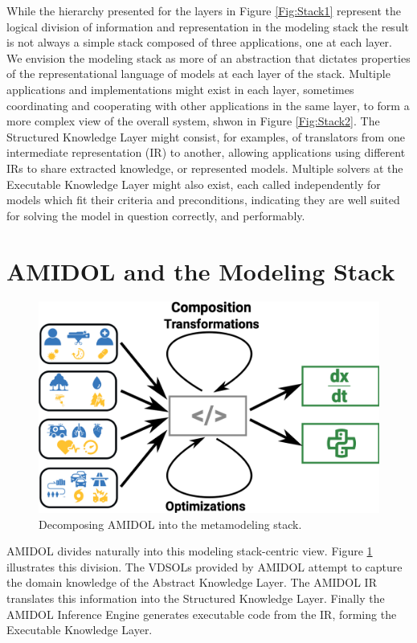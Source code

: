 \documentclass[11pt]{article}
\newcommand{\amidol}{\textsc{AMIDOL}}
\begin{document}
While the hierarchy presented for the layers in Figure
\ref{Fig:Stack1} represent the logical division of information and
representation in the modeling stack the result is not always a
simple stack composed of three applications, one at each layer.  We
envision the modeling stack as more of an abstraction that dictates
properties of the representational language of models at each layer of
the stack.  Multiple applications and implementations might exist in
each layer, sometimes coordinating and cooperating with other
applications in the same layer, to form a more complex view of the
overall system, shwon in Figure \ref{Fig:Stack2}.  The Structured Knowledge Layer might consist, for
examples, of translators from one intermediate representation (IR) to
another, allowing applications using different IRs to share extracted
knowledge, or represented models.  Multiple solvers at the Executable
Knowledge Layer might also exist, each called independently for models
which fit their criteria and preconditions, indicating they are well
suited for solving the model in question correctly, and performably.

\section{\amidol{} and the Modeling Stack}

\begin{figure}
  \includegraphics[width=\textwidth]{figs/AMIDOL-flow.png}
  \caption{Decomposing \amidol{} into the metamodeling stack.}
  \label{Fig:AMIDOL-Flow}
\end{figure}

\amidol{} divides naturally into this modeling stack-centric view.
Figure \ref{Fig:AMIDOL-Flow} illustrates this division.  The VDSOLs
provided by \amidol{} attempt to capture the domain knowledge of the
Abstract Knowledge Layer.  The \amidol{} IR translates this
information into the Structured Knowledge Layer.  Finally the
\amidol{} Inference Engine generates executable code from the IR,
forming the Executable Knowledge Layer.
\end{document}
